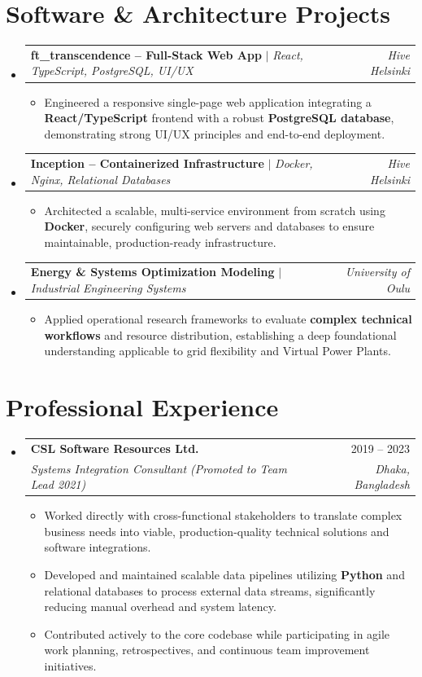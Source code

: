 \documentclass[a4paper,11pt]{article}
\makeatletter
\newcommand{\resumeItem}[1]{
  \item\small{{#1}}
}
\newcommand{\resumeSubheading}[4]{
  \vspace{-1pt}\item
    \begin{tabular*}{0.97\textwidth}[t]{l@{\extracolsep{\fill}}r}
      \textbf{#1} & \small #2 \\
      \textit{\small#3} & \textit{\small #4} \\
    \end{tabular*}\vspace{-6pt}
}
\newcommand{\resumeProjectHeading}[2]{
    \item
    \begin{tabular*}{0.97\textwidth}{l@{\extracolsep{\fill}}r}
      \small#1 & \textit{\small #2} \\
    \end{tabular*}\vspace{-6pt}
}
\newcommand{\resumeSubHeadingListStart}{\begin{itemize}[leftmargin=0.15in, label={}]}
\newcommand{\resumeSubHeadingListEnd}{\end{itemize}\vspace{-6pt}}
\newcommand{\resumeItemListStart}{
  \begin{itemize}[leftmargin=0.2in, itemsep=0pt, parsep=0pt, topsep=1pt]
}
\newcommand{\resumeItemListEnd}{\end{itemize}\vspace{-2pt}}
\makeatother
\begin{document}
\vspace{-6pt}

\section{Software \& Architecture Projects}
\resumeSubHeadingListStart
    \resumeProjectHeading
      {\textbf{ft\_transcendence -- Full-Stack Web App} $|$ \emph{React, TypeScript, PostgreSQL, UI/UX}}{Hive Helsinki}
      \resumeItemListStart
        \resumeItem{Engineered a responsive single-page web application integrating a \textbf{React/TypeScript} frontend with a robust \textbf{PostgreSQL database}, demonstrating strong UI/UX principles and end-to-end deployment.}
      \resumeItemListEnd

    \resumeProjectHeading
      {\textbf{Inception -- Containerized Infrastructure} $|$ \emph{Docker, Nginx, Relational Databases}}{Hive Helsinki}
      \resumeItemListStart
        \resumeItem{Architected a scalable, multi-service environment from scratch using \textbf{Docker}, securely configuring web servers and databases to ensure maintainable, production-ready infrastructure.}
      \resumeItemListEnd

    \resumeProjectHeading
      {\textbf{Energy \& Systems Optimization Modeling} $|$ \emph{Industrial Engineering Systems}}{University of Oulu}
      \resumeItemListStart
        \resumeItem{Applied operational research frameworks to evaluate \textbf{complex technical workflows} and resource distribution, establishing a deep foundational understanding applicable to grid flexibility and Virtual Power Plants.}
      \resumeItemListEnd
\resumeSubHeadingListEnd

\vspace{-4pt}

\section{Professional Experience}
\resumeSubHeadingListStart
\resumeSubheading
  {CSL Software Resources Ltd.}{2019 -- 2023}
  {Systems Integration Consultant (Promoted to Team Lead 2021)}{Dhaka, Bangladesh}
  \resumeItemListStart
    \resumeItem{Worked directly with cross-functional stakeholders to translate complex business needs into viable, production-quality technical solutions and software integrations.}
    \resumeItem{Developed and maintained scalable data pipelines utilizing \textbf{Python} and relational databases to process external data streams, significantly reducing manual overhead and system latency.}
    \resumeItem{Contributed actively to the core codebase while participating in agile work planning, retrospectives, and continuous team improvement initiatives.}
  \resumeItemListEnd
\resumeSubHeadingListEnd
\end{document}
